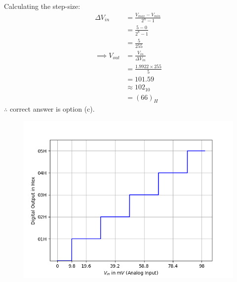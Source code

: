 \documentclass[journal,12pt,twocolumn]{IEEEtran}
\theoremstyle{remark}
\begin{document}
Calculating the step-size:
\begin{align}
    \Delta V_{in} &= \frac{V_{max} - V_{min}}{2^n - 1}\\
    &= \frac{5 - 0}{2^8 - 1}\\
    &= \frac{5}{255}\\
   \implies V_{out} &= \frac{V_{in}}{\Delta V_{in}}\\
    &= \frac{1.9922 \times 255}{5}\\
    &= 101.59\\
    &\approx 102_{10}\\
    &= (66)_{H}
\end{align}
$\therefore$ correct answer is option (c).
\begin{figure}[!h]
    \centering
    \includegraphics[width=\columnwidth]{2023/EE/40/figs/assign3.png}
    \caption{}
    \label{fig:ADC_plot_gate.ee.23.40}
\end{figure}
\end{document}
